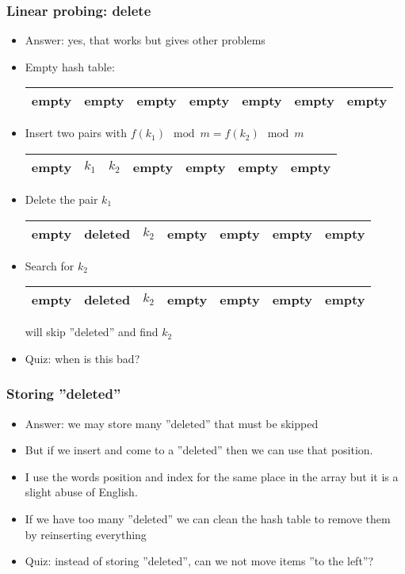 \documentclass[trans]{beamer}
\begin{document}
\begin{frame}[fragile=singleslide]
\frametitle{Linear probing: delete}
\begin{itemize}
\item Answer: yes, that works but gives other problems
\item Empty hash table:
\begin{tabular}{|p{1cm}|p{1cm}|p{1cm}|p{1cm}|p{1cm}|p{1cm}|p{1cm}|}
\hline 
empty & empty & empty & empty & empty & empty & empty \\
\hline 
\end{tabular}

\item Insert two pairs with $f(k_1) \mod m = f(k_2) \mod m$
\begin{tabular}{|p{1cm}|p{1cm}|p{1cm}|p{1cm}|p{1cm}|p{1cm}|p{1cm}|}
\hline 
empty & $k_1$ & $k_2$ & empty & empty & empty & empty \\
\hline 
\end{tabular}
\item Delete the pair $k_1$
\begin{tabular}{|p{1cm}|p{1cm}|p{1cm}|p{1cm}|p{1cm}|p{1cm}|p{1cm}|}
\hline 
empty & deleted & $k_2$ & empty & empty & empty & empty \\
\hline 
\end{tabular}
\item Search for $k_2$
\begin{tabular}{|p{1cm}|p{1cm}|p{1cm}|p{1cm}|p{1cm}|p{1cm}|p{1cm}|}
\hline 
empty & deleted & $k_2$ & empty & empty & empty & empty \\
\hline 
\end{tabular}

will skip ''deleted'' and find $k_2$
\item Quiz: when is this bad?
\end{itemize}
\end{frame}

\begin{frame}[fragile=singleslide]
\frametitle{Storing ''deleted''}
\begin{itemize}
\item Answer: we may store many ''deleted'' that must be skipped
\item But if we insert and come to a ''deleted'' then we can use that position.
\item I use the words position and index for the same place in the array but it is a slight abuse of English.
\item If we have too many ''deleted'' we can clean the hash table to remove them by reinserting everything
\item Quiz: instead of storing ''deleted'', can we not move items ''to the left''?
\end{itemize}
\end{frame}
\end{document}
